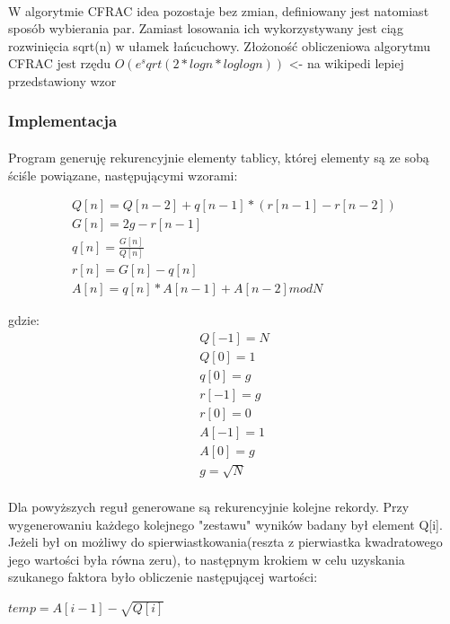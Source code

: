 \documentclass{article}
\begin{document}
\paragraph{}W algorytmie CFRAC idea pozostaje bez zmian, definiowany jest natomiast sposób wybierania par. Zamiast losowania ich wykorzystywany jest ciąg rozwinięcia sqrt(n) w ułamek łańcuchowy. Złożoność obliczeniowa algorytmu CFRAC jest rzędu $O(e^sqrt(2* logn * loglog n))$ <- na wikipedi lepiej przedstawiony wzor

\subsubsection{Implementacja\cite{cfracimpl}}
\paragraph{}Program generuję rekurencyjnie elementy tablicy, której elementy są ze sobą ściśle powiązane, następującymi wzorami:

\begin{align*}
Q[n] = Q[n-2] + q[n-1] * (r[n-1] - r[n-2])\\
G[n] = 2g - r[n-1]\\
q[n] = \frac{G[n]}{Q[n]}\\
r[n] = G[n] - q[n]\\
A[n] = q[n]*A[n-1] + A[n-2]modN
\end{align*}

gdzie:\begin{align*}
Q[-1]= N\\Q[0] = 1\\ q[0] = g\\r[-1] = g\\r[0] = 0\\
A[-1]= 1\\A[0] = g\\g = \sqrt{N}
\end{align*}	
\paragraph{}Dla powyższych reguł generowane są rekurencyjnie kolejne rekordy. Przy wygenerowaniu każdego kolejnego "zestawu" wyników badany był element Q[i]. Jeżeli był on możliwy do spierwiastkowania(reszta z pierwiastka kwadratowego jego wartości była równa zeru), to następnym krokiem w celu uzyskania szukanego faktora było obliczenie następującej wartości:

$temp = A[i-1] - \sqrt{Q[i]}$
\end{document}
